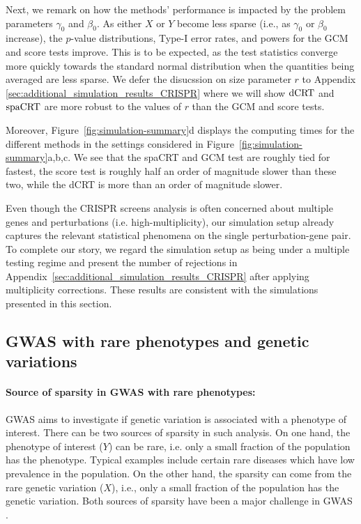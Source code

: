 \documentclass[12pt]{article}
\theoremstyle{definition}
\newcommand{\srx}{X}									%
\newcommand{\sry}{Y}									%
\newcommand{\dCRT}{\textnormal{dCRT}} 					%
\newcommand{\spacrt}{\textnormal{spaCRT}}               %
\begin{document}
Next, we remark on how the methods' performance is impacted by the problem parameters $\gamma_0$ and $\beta_0$. As either $\srx$ or $\sry$ become less sparse (i.e., as $\gamma_0$ or $\beta_0$ increase), the $p$-value distributions, Type-I error rates, and powers for the GCM and score tests improve. This is to be expected, as the test statistics converge more quickly towards the standard normal distribution when the quantities being averaged are less sparse. We defer the disucssion on size parameter $r$ to Appendix \ref{sec:additional_simulation_results_CRISPR} where we will show $\dCRT$ and $\spacrt$ are more robust to the values of $r$ than the GCM and score tests.


Moreover, Figure~\ref{fig:simulation-summary}d displays the computing times for the different methods in the settings considered in Figure~\ref{fig:simulation-summary}a,b,c. We see that the spaCRT and GCM test are roughly tied for fastest, the score test is roughly half an order of magnitude slower than these two, while the dCRT is more than an order of magnitude slower. 

Even though the CRISPR screens analysis is often concerned about multiple genes and perturbations (i.e. high-multiplicity), our simulation setup already captures the relevant statistical phenomena on the single perturbation-gene pair. To complete our story, we regard the simulation setup as being under a multiple testing regime and present the number of rejections in Appendix~\ref{sec:additional_simulation_results_CRISPR} after applying multiplicity corrections. These results are consistent with the simulations presented in this section. 



\subsection{GWAS with rare phenotypes and genetic variations}\label{sec:GWAS}

\paragraph{Source of sparsity in GWAS with rare phenotypes:}

GWAS aims to investigate if genetic variation is associated with a phenotype of interest. There can be two sources of sparsity in such analysis. On one hand, the phenotype of interest ($Y$) can be rare, i.e. only a small fraction of the population has the phenotype. Typical examples include certain rare diseases which have low prevalence in the population. On the other hand, the sparsity can come from the rare genetic variation ($X$), i.e., only a small fraction of the population has the genetic variation. Both sources of sparsity have been a major challenge in GWAS \citep{auer2015rare,zhao2020uk,dey2017fast,turro2020whole}.
\end{document}
